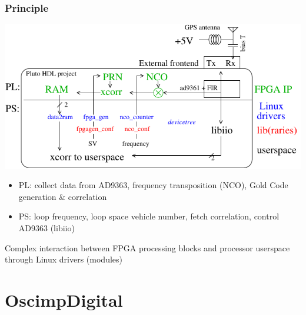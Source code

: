 \documentclass[compress,10pt]{beamer}
\begin{document}
\begin{frame}[fragile]\frametitle{Principle}

\begin{center}
\includegraphics[width=\linewidth]{plutopluto-oscimpDigital-makerspace}
\end{center}

\begin{itemize}
\item PL: collect data from AD9363, frequency transposition (NCO), Gold Code generation \& correlation
\item PS: loop frequency, loop space vehicle number, fetch correlation, control AD9363 (libiio)
\end{itemize}

Complex interaction between FPGA processing blocks and processor userspace through
Linux drivers (modules)
\end{frame}

\section{OscimpDigital}

%
\end{document}
